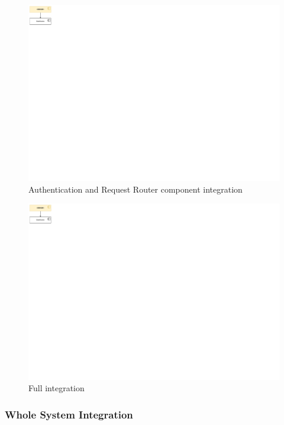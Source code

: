 \documentclass[11pt]{article}
\begin{document}
\begin{figure}[!ht]
    \centering
    \includegraphics[page={9}, trim=0cm 21cm 14cm 0cmm, width=\linewidth, clip]{IntegrationDiagram.pdf}
    \caption{Authentication and Request Router component integration}
\end{figure}

\newpage

\begin{figure}[!ht]
    \centering
    \includegraphics[page={10}, trim=0cm 21cm 14cm 0cmm, width=\linewidth, clip]{IntegrationDiagram.pdf}
    \caption{Full integration}
\end{figure}

\subsubsection{Whole System Integration}
\end{document}
